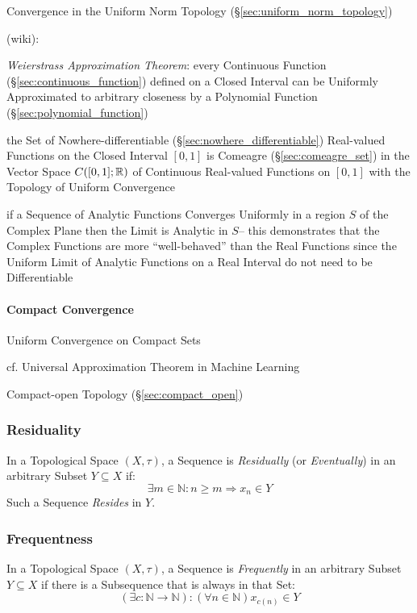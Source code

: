 Convergence in the Uniform Norm Topology (\S\ref{sec:uniform_norm_topology})

(wiki):

\emph{Weierstrass Approximation Theorem}: every Continuous Function
(\S\ref{sec:continuous_function}) defined on a Closed Interval can be Uniformly
Approximated to arbitrary closeness by a Polynomial Function
(\S\ref{sec:polynomial_function})

the Set of Nowhere-differentiable (\S\ref{sec:nowhere_differentiable})
Real-valued Functions on the Closed Interval $[0,1]$ is Comeagre
(\S\ref{sec:comeagre_set}) in the Vector Space $C([0,1]; \mathbb{R})$ of Continuous
Real-valued Functions on $[0,1]$ with the Topology of Uniform Convergence

if a Sequence of Analytic Functions Converges Uniformly in a region $S$ of the
Complex Plane then the Limit is Analytic in $S$-- this demonstrates that the
Complex Functions are more ``well-behaved'' than the Real Functions since the
Uniform Limit of Analytic Functions on a Real Interval do not need to be
Differentiable



\paragraph{Compact Convergence}\label{sec:compact_convergence}\hfill

Uniform Convergence on Compact Sets

cf. Universal Approximation Theorem in Machine Learning

Compact-open Topology (\S\ref{sec:compact_open})



\subsubsection{Residuality}\label{sec:reside}

In a Topological Space $(X, \tau)$, a Sequence is \emph{Residually}
(or \emph{Eventually}) in an arbitrary Subset $Y \subseteq X$ if:
\[
  \exists m \in \mathbb{N} : n \geq m \Rightarrow x_n \in Y
\]
Such a Sequence \emph{Resides} in $Y$.



\subsubsection{Frequentness}\label{sec:frequent}

In a Topological Space $(X, \tau)$, a Sequence is \emph{Frequently}
in an arbitrary Subset $Y \subseteq X$ if there is a Subsequence that
is always in that Set:
\[
  (\exists c : \mathbb{N} \rightarrow \mathbb{N})
  : (\forall n \in \mathbb{N}) x_{c(n)} \in Y
\]



